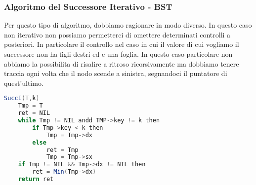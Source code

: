 \subsubsection{Algoritmo del Successore Iterativo - BST}

Per questo tipo di algoritmo, dobbiamo ragionare in modo diverso. In questo caso non iterativo non possiamo permetterci di omettere determinati controlli a posteriori. In particolare il controllo nel caso in cui il valore di cui vogliamo il successore non ha figli destri ed e una foglia. In questo caso particolare non abbiamo la possibilita di risalire a ritroso ricorsivamente ma dobbiamo tenere traccia ogni volta che il nodo scende a sinistra, segnandoci il puntatore di quest'ultimo.

\begin{lstlisting}[language=Java]
	SuccI(T,k)
	Tmp = T
	ret = NIL
	while Tmp != NIL andd TMP->key != k then
		if Tmp->key < k then
			Tmp = Tmp->dx
		else 
			ret = Tmp
			Tmp = Tmp->sx
	if Tmp != NIL && Tmp->dx != NIL then
		ret = Min(Tmp->dx)
	return ret
\end{lstlisting}
